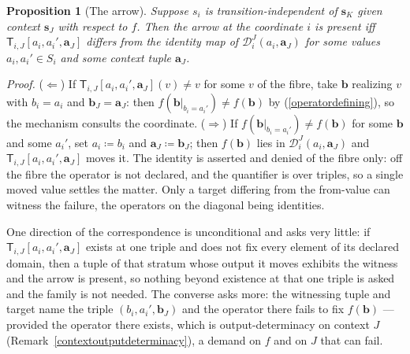 \documentclass{article}
\newtheorem{proposition}{Proposition}
\theoremstyle{definition}
\theoremstyle{remark}
\begin{document}
\begin{proposition}[The arrow]
\label{arrowcorrespondence}
Suppose $s_i$ is transition-independent of $\boldsymbol{s}_K$ given context $\boldsymbol{s}_J$ with respect to $f$. Then the arrow at the coordinate $i$ is present iff $\mathsf{T}_{i,J}[a_i, a_i', \boldsymbol{a}_J]$ differs from the identity map of $\mathcal{D}_i^J(a_i, \boldsymbol{a}_J)$ for some values $a_i, a_i' \in S_i$ and some context tuple $\boldsymbol{a}_J$.
\end{proposition}

\noindent \textit{Proof.} ($\Leftarrow$) If $\mathsf{T}_{i,J}[a_i, a_i', \boldsymbol{a}_J](v) \neq v$ for some $v$ of the fibre, take $\boldsymbol{b}$ realizing $v$ with $b_i = a_i$ and $\boldsymbol{b}_J = \boldsymbol{a}_J$: then $f(\boldsymbol{b}|_{b_i = a_i'}) \neq f(\boldsymbol{b})$ by (\ref{operatordefining}), so the mechanism consults the coordinate. ($\Rightarrow$) If $f(\boldsymbol{b}|_{b_i = a_i'}) \neq f(\boldsymbol{b})$ for some $\boldsymbol{b}$ and some $a_i'$, set $a_i \coloneqq b_i$ and $\boldsymbol{a}_J \coloneqq \boldsymbol{b}_J$; then $f(\boldsymbol{b})$ lies in $\mathcal{D}_i^J(a_i, \boldsymbol{a}_J)$ and $\mathsf{T}_{i,J}[a_i, a_i', \boldsymbol{a}_J]$ moves it. The identity is asserted and denied of the fibre only: off the fibre the operator is not declared, and the quantifier is over triples, so a single moved value settles the matter. Only a target differing from the from-value can witness the failure, the operators on the diagonal being identities.

\noindent One direction of the correspondence is unconditional and asks very little: if $\mathsf{T}_{i,J}[a_i, a_i', \boldsymbol{a}_J]$ exists at one triple and does not fix every element of its declared domain, then a tuple of that stratum whose output it moves exhibits the witness and the arrow is present, so nothing beyond existence at that one triple is asked and the family is not needed. The converse asks more: the witnessing tuple and target name the triple $(b_i, a_i', \boldsymbol{b}_J)$ and the operator there fails to fix $f(\boldsymbol{b})$ --- provided the operator there exists, which is output-determinacy on context $J$ (Remark~\ref{contextoutputdeterminacy}), a demand on $f$ and on $J$ that can fail.
\end{document}

